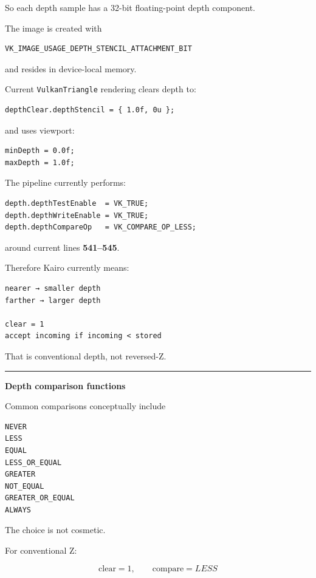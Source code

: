 So each depth sample has a 32-bit floating-point depth component.

The image is created with

\begin{verbatim}
VK_IMAGE_USAGE_DEPTH_STENCIL_ATTACHMENT_BIT
\end{verbatim}

and resides in device-local memory.

Current \texttt{VulkanTriangle} rendering clears depth to:

\begin{verbatim}
depthClear.depthStencil = { 1.0f, 0u };
\end{verbatim}

and uses viewport:

\begin{verbatim}
minDepth = 0.0f;
maxDepth = 1.0f;
\end{verbatim}

The pipeline currently performs:

\begin{verbatim}
depth.depthTestEnable  = VK_TRUE;
depth.depthWriteEnable = VK_TRUE;
depth.depthCompareOp   = VK_COMPARE_OP_LESS;
\end{verbatim}

around current lines \textbf{541--545}.

Therefore Kairo currently means:

\begin{verbatim}
nearer → smaller depth
farther → larger depth

clear = 1
accept incoming if incoming < stored
\end{verbatim}

That is conventional depth, not reversed-Z.

\begin{center}\rule{0.5\linewidth}{0.5pt}\end{center}

\textbf{Depth comparison functions}

Common comparisons conceptually include

\begin{verbatim}
NEVER
LESS
EQUAL
LESS_OR_EQUAL
GREATER
NOT_EQUAL
GREATER_OR_EQUAL
ALWAYS
\end{verbatim}

The choice is not cosmetic.

For conventional Z:

\[
\text{clear}=1,\qquad
\text{compare}=LESS
\]

